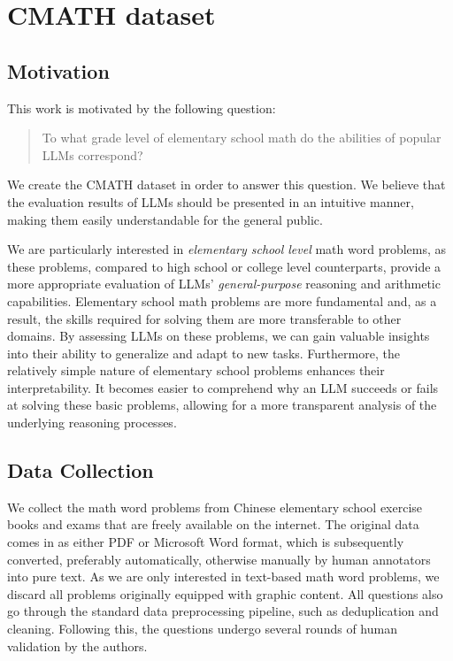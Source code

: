\section{CMATH dataset}
\subsection{Motivation}
This work is motivated by the following question:

\begin{quote}
To what grade level of elementary school math do the abilities of popular LLMs correspond?
\end{quote}

We create the CMATH dataset in order to  answer this question. We believe that the evaluation results of LLMs should be presented in an intuitive manner, making them easily understandable for the general public.

We are particularly interested in \emph{elementary school level} math word problems, as these problems, compared to high school or college level counterparts, provide a more appropriate evaluation of LLMs' \emph{general-purpose} reasoning and arithmetic capabilities. Elementary school math problems are more fundamental and, as a result, the skills required for solving them are more transferable to other domains. By assessing LLMs on these problems, we can gain valuable insights into their ability to generalize and adapt to new tasks. Furthermore, the relatively simple nature of elementary school problems enhances their interpretability. It becomes easier to comprehend why an LLM succeeds or fails at solving these basic problems, allowing for a more transparent analysis of the underlying reasoning processes.

\subsection{Data Collection \label{dataset}}
We collect the math word problems from Chinese elementary school exercise books and exams that are freely available on the internet. The original data comes in as either PDF or Microsoft Word format, which is subsequently converted, preferably automatically, otherwise manually by human annotators into pure text. As we are only interested in text-based math word problems, we discard all problems originally equipped with graphic content. All questions also go through the standard data preprocessing pipeline, such as deduplication and cleaning. Following this, the questions undergo several rounds of human validation by the authors. 

